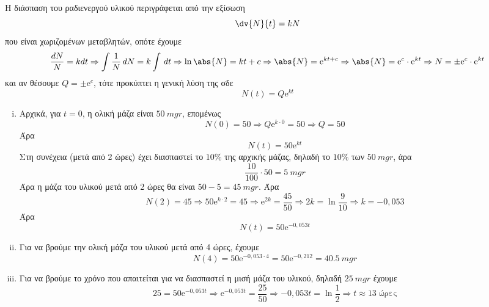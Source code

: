 \begin{solution}
  Η διάσπαση του ραδιενεργού υλικού περιγράφεται από την εξίσωση 
  \[
    \dv{N}{t} = kN 
  \] 
  που είναι χωριζομένων μεταβλητών, οπότε έχουμε
  \[ 
    \frac{dN}{N} = k dt \Rightarrow \int \frac{1}{N} \,{dN} = k \int \,{dt} \Rightarrow 
    \ln{\abs{N}} = kt + c \Rightarrow \abs{N} = \mathrm{e}^{kt+c} \Rightarrow \abs{N} = 
    \mathrm{e}^{c} \cdot \mathrm{e}^{kt} \Rightarrow N = \pm \mathrm{e}^{c} \cdot
    \mathrm{e}^{kt}
  \]
  και αν θέσουμε $ Q = \pm \mathrm{e}^{c} $, τότε προκύπτει η γενική λύση της σδε
  \[
    N(t) = Q \mathrm{e}^{kt} 
  \]
  \begin{enumerate}[i)]
    \item Αρχικά, για $ t=0 $, η ολική μάζα είναι $ \SI{50}{mgr} $, επομένως
      \[
        N(0) = 50 \Rightarrow Q \mathrm{e}^{k\cdot 0} = 50 \Rightarrow Q = 50 
      \] 
      Άρα 
      \[
        N(t) = 50 \mathrm{e}^{kt} 
      \] 
      Στη συνέχεια (μετά από 2 ώρες) έχει διασπαστεί το $ 10 \% $ της αρχικής μάζας, 
      δηλαδή το $ 10 \% $ των $ \SI{50}{mgr} $, άρα  
      \[ \frac{10}{100} \cdot 50 = \SI{5}{mgr} \]
      Άρα η μάζα του υλικού μετά από 2 ώρες θα είναι $ 50-5= \SI{45}{mgr} $. Άρα 
      \[
        N(2) = 45 \Rightarrow 50 \mathrm{e}^{k\cdot 2} = 45 \Rightarrow 
        \mathrm{e}^{2k} = \frac{45}{50} \Rightarrow 2k = \ln{\frac{9}{10}} 
        \Rightarrow k = -0,053
      \] 
      Άρα 
      \[
        N(t) = 50 \mathrm{e}^{-0,053 t} 
      \]
    \item Για να βρούμε την ολική μάζα του υλικού μετά από 4 ώρες, έχουμε
      \[
        N(4) = 50 \mathrm{e}^{-0,053\cdot 4} = 50 \mathrm{e}^{-0,212} = \SI{40,5}{mgr}
      \] 
    \item Για να βρούμε το χρόνο που απαιτείται για να διασπαστεί η μισή μάζα του 
      υλικού, δηλαδή $ \SI{25}{mgr} $ έχουμε
      \[
        25 = 50 \mathrm{e}^{-0,053t} \Rightarrow \mathrm{e}^{-0,053t} = \frac{25}{50} 
        \Rightarrow -0,053 t = \ln{\frac{1}{2}} \Rightarrow t \approx 13 \; \text{ώρες}
      \] 
  \end{enumerate}
\end{solution}

